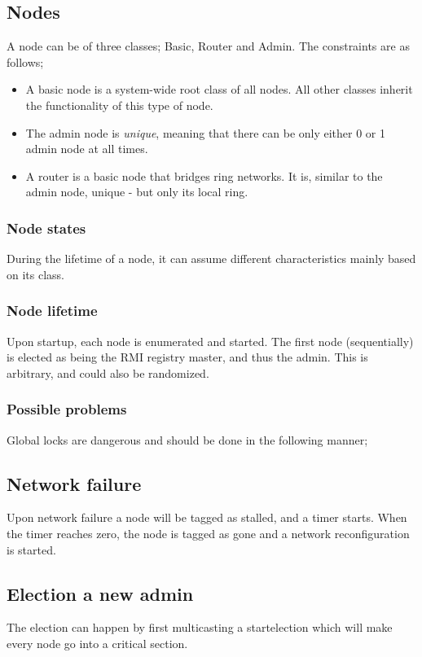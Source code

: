 \documentclass[10pt,a4paper]{article}
\begin{document}
\subsection{Nodes}
A node can be of three classes; Basic, Router and Admin. The constraints are as follows;
\begin{itemize}
\item A basic node is a system-wide root class of all nodes. All other classes inherit the functionality of this type of node.
\item The admin node is \emph{unique}, meaning that there can be only either 0 or 1 admin node at all times.
\item A router is a basic node that bridges ring networks. It is, similar to the admin node, unique - but only its local ring.
\end{itemize}


\subsubsection{Node states}
During the lifetime of a node, it can assume different characteristics mainly based on its class.

\subsubsection{Node lifetime}
Upon startup, each node is enumerated and started. The first node (sequentially) is elected as being the RMI registry master, and thus the admin. This is arbitrary, and could also be randomized.

\subsubsection{Possible problems}
Global locks are dangerous and should be done in the following manner; 

\subsection{Network failure}

Upon network failure a node will be tagged as stalled, and a timer starts. When the timer reaches zero, the node is tagged as gone and a network reconfiguration is started.

\subsection{Election a new admin}
The election can happen by first multicasting a startelection which will make every node go into a critical section.
\end{document}
